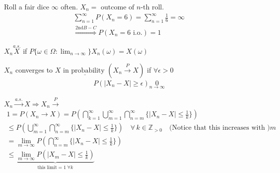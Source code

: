 \documentclass[11pt]{article}
\begin{document}
\begin{example}
    Roll a fair dice $\infty$ often. $X_n = \text{ outcome of }n \text{-th roll}$.
    \begin{align*}
        \sum_{n=1}^{\infty}P(X_n = 6) = \sum_{n=1}^{\infty}\frac{1}{6} = \infty\\
        \overset{\text{2nd} B-C}{\Longrightarrow} P(X_n = 6 \text{ i.o.})  = 1
    \end{align*}
\end{example}

\begin{definition}
    $X_n \overset{a.s.}{X}$ if $P\{ \omega \in \Omega: \lim_{n \to \infty} \}X_n(\omega) = X(\omega)$
\end{definition}

\begin{definition}
    $X_n$ converges to $X$ $\underline{\text{in probability }} (X_n \overset{P}{\to} X)$ 
    if $\forall \epsilon > 0$
    \begin{align*}
        P(|X_n - X| \ge \epsilon) \underset{n\to \infty}{0}
    \end{align*}
\end{definition}

\begin{remark}[Observation]
    $X_n \overset{a.s.}{\longrightarrow} X \Longrightarrow X_n \overset{P}{\longrightarrow}$
    \begin{align*}
        1 = P(X_n \longrightarrow X) = P(\bigcap_{k=1}^{\infty}\bigcup _{m=1}^{\infty}\bigcap_{n=m}^{\infty}
        \{ |X_n - X| \le \frac{1}{k} \})\\
        \le P(\bigcup _{m=1}^{\infty}\bigcap _{n=m}^{\infty}\{ |X_n-X| \le \frac{1}{k} \}) \quad \forall \, k \in \mathbb{Z}_{> 0}
        \quad \text{(Notice that this increases with )}m \\
        = \lim_{m \to \infty}P(\bigcap_{n=m}^{\infty}\{ |X_n-X| \le \frac{1}{k} \}) \\
        \le \underbrace{\lim_{m \to \infty} P(|X_m - X| \le \frac{1}{k})}_{\text{this limit} = 1 \; \forall k}
    \end{align*}
\end{remark}
\end{document}
